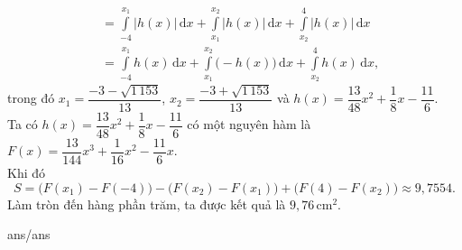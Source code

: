 \begin{ex}
{\begin{align*}
			&= \displaystyle\int\limits_{-4}^{x_1} \big|h(x)\big| \mathrm{\,d}x+\displaystyle\int\limits_{x_1}^{x_2} \big|h(x)\big| \mathrm{\,d}x+\displaystyle\int\limits_{x_2}^{4} \big|h(x)\big| \mathrm{\,d}x\\
			&= \displaystyle\int\limits_{-4}^{x_1} h(x) \mathrm{\,d}x+\displaystyle\int\limits_{x_1}^{x_2} \big(-h(x)\big) \mathrm{\,d}x+\displaystyle\int\limits_{x_2}^{4} h(x) \mathrm{\,d}x\text{,}
		\end{align*}
		trong đó $x_1=\dfrac{-3-\sqrt{1\,153}}{13}$, $x_2=\dfrac{-3+\sqrt{1\,153}}{13}$ và $h(x) = \dfrac{13}{48}x^2+\dfrac{1}{8}x-\dfrac{11}{6}$.\\
		Ta có $h(x) =\dfrac{13}{48}x^2+\dfrac{1}{8}x-\dfrac{11}{6}$ có một nguyên hàm là $F(x) = \dfrac{13}{144}x^3+\dfrac{1}{16}x^2-\dfrac{11}{6}x$.\\
		Khi đó
		\[S = \big(F(x_1)-F(-4)\big)-\big(F(x_2)-F(x_1)\big)+\big(F(4)-F(x_2)\big)\approx9{,}7554.
		\]
		Làm tròn đến hàng phần trăm, ta được kết quả là $9{,}76$\,cm$^2$.
	}
\end{ex}

\begin{indapan}
	{ans/ans\currfilebase}
\end{indapan}